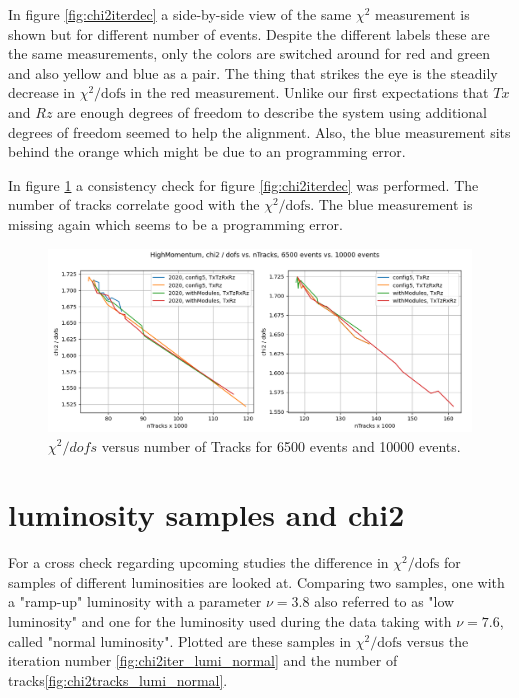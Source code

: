 In figure \ref{fig:chi2iterdec} a side-by-side view of the same $\chi^2$ measurement
is shown but for different number of events. Despite the different labels these are the same measurements, only the colors are switched around for red and green and also yellow and blue as a pair. The thing that strikes the eye is the steadily decrease in $\chi^2 / \text{dofs}$ in the red measurement. Unlike our first expectations that $Tx$ and $Rz$ are enough degrees of freedom to describe the system using additional degrees of freedom seemed to help the alignment.
Also, the blue measurement sits behind the orange which might be due to an
programming error.

In figure \ref{fig:chi2tracksdec} a consistency check for figure
\ref{fig:chi2iterdec} was performed. The number of tracks correlate good with
the $\chi^2 / \text{dofs}$. The blue measurement is missing again which seems to be a
programming error.

\begin{figure}
  \centering
  \includegraphics[width=\textwidth]{plots/LHCB_week_dec/chi2_vs_tracks_normal.png}
  \caption{$\chi^2 / dofs$ versus number of Tracks for 6500 events and 10000 events.}
  \label{fig:chi2tracksdec}
\end{figure}

\section{luminosity samples and chi2}
For a cross check regarding upcoming studies the difference in $\chi^2 / \text{dofs}$ for samples of different luminosities are looked at.
Comparing two samples, one with a "ramp-up" luminosity with a parameter $\nu = 3.8$ also referred to as "low luminosity" and one for the luminosity used during the data taking
with $\nu = 7.6$, called "normal luminosity".
Plotted are these samples in $\chi^2 / \text{dofs}$ versus the iteration number \ref{fig:chi2iter_lumi_normal} and the number of tracks\ref{fig:chi2tracks_lumi_normal}.

